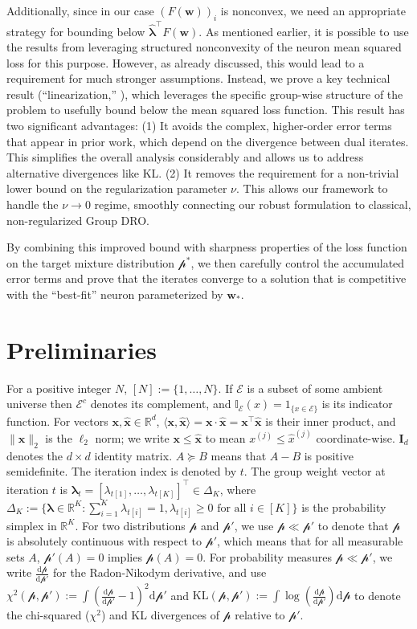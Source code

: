 \documentclass[11pt]{article}
\numberwithin{thm}{section}
\theoremstyle{plain}
\theoremstyle{definition}
\theoremstyle{remark} \newtheorem{remark}[thm]{Remark}
\def\vlambda{{\bm{\lambda}}}
\def\vw{{\bm{w}}}
\def\vx{{\bm{x}}}
\def\pp{{\mathcal{p}}}
\def\vxh{\widehat{\bm{x}}}
\def\mI{{\bm{I}}}
\def\cE{{\mathcal{E}}}
\newcommand{\R}{\mathbb{R}}
\newcommand{\Ind}{\mathbb{I}}
\newcommand{\dd}{\mathrm{d}}
\newcommand{\evlambda}{\widehat{\vlambda}}
\begin{document}
Additionally, since in our case $(F(\vw))_i$ is nonconvex, we need an appropriate strategy for bounding below ${\evlambda}^\top F(\vw)$. As mentioned earlier, it is possible to use the results from \citep{Li2024shifts} leveraging structured nonconvexity of the neuron mean squared loss for this purpose. However, as already discussed, this would lead to a requirement for much stronger assumptions. Instead, we prove a key technical result  (``linearization,'' ), which  leverages the specific group-wise structure of the problem to usefully bound below the mean squared loss function.
This result has two significant advantages:
(1) It avoids the complex, higher-order error terms that appear in prior work, 
	which depend on the divergence between dual iterates. 
	This simplifies the overall analysis considerably and allows us to address alternative divergences like KL.
    (2) It removes the requirement for a non-trivial lower bound on the regularization parameter \(\nu\). 
	This allows our framework to handle the \(\nu \to 0\) regime, 
	smoothly connecting our robust formulation to classical, non-regularized Group DRO.

By combining this improved bound with sharpness properties of the loss function on the target mixture distribution \(\pp^*\), 
we then carefully control the accumulated error terms and prove that the iterates converge to a solution that 
is competitive with the ``best-fit'' neuron parameterized by \(\vw_*\).

\section{Preliminaries}\label{sec:prelims}
For a positive integer $N$, $[N] := \{1, \dots, N\}$. 
If $\cE$ is a subset of some ambient universe then $\cE^c$ denotes its complement, and $\Ind_{\cE}(x)=1_{\{x\in\cE\}}$ is its indicator function.  
For vectors $\vx, \vxh \in \R^d$, $\langle\vx, \vxh\rangle = \vx \cdot \vxh = \vx^\top \vxh$ is their inner product, and $\|\vx\|_2$ is the $\ell_2$ norm; we write $\vx\le\vxh$ to mean $x^{(j)}\le\hat x^{(j)}$ coordinate-wise.  
$\mI_d$ denotes the $d \times d$ identity matrix.
$A \succeq B$ means that $A-B$ is positive semidefinite.
The iteration index is denoted by $t$. 
The group weight vector at iteration $t$ is $\vlambda_t = [\lambda_{t[1]}, \dots, \lambda_{t[K]}]^\top \in \Delta_K$, where $\Delta_K := \{\vlambda \in \R^K : \sum_{i=1}^K \lambda_{t[i]} = 1, \lambda_{t[i]} \ge 0 \text{ for all } i \in [K]\}$ is the probability simplex in $\R^K$.
 For two distributions \(\pp\) and \(\pp'\), we use \(\pp\ll\pp'\) to denote that \(\pp\) is absolutely continuous with respect to \(\pp'\), which means that for all measurable sets \(A\), \(\pp'(A)=0\) implies \(\pp(A)=0\). 
For probability measures $\pp\ll\pp'$, we write $\tfrac{\dd\pp}{\dd\pp'}$ for the Radon-Nikodym derivative, and  
 use $\chi^2(\pp,\pp'):= \int(\frac{\mathrm{d}\pp}{\mathrm{d}\pp'} - 1)^2\mathrm{d}\pp'$ and $\mathrm{KL}(\pp,\pp'):= \int\log (\frac{\mathrm{d}\pp}{\mathrm{d}\pp'})\mathrm{d}\pp$ to denote the chi-squared ($\chi^2$) and KL divergences of $\pp$ relative to $\pp'$.
\end{document}
